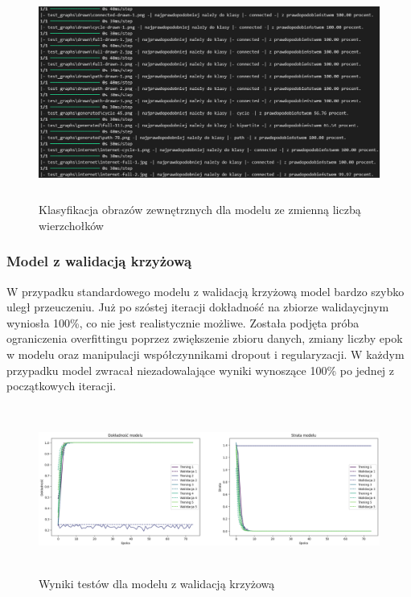 \begin{figure}[ht]
	\centering
	\includegraphics[height=7cm]{partials/images/tests/v2_epoch75_img_tests.png}
	\caption{Klasyfikacja obrazów zewnętrznych dla modelu ze zmienną liczbą wierzchołków}
\label{Fig:GraphUndirected}
\end{figure}
\FloatBarrier

\subsubsection{Model z walidacją krzyżową}

W przypadku standardowego modelu z walidacją krzyżową model bardzo szybko uległ przeuczeniu.
Już po szóstej iteracji dokładność na zbiorze walidaycjnym wyniosła 100\%, co nie jest realistycznie możliwe.
Została podjęta próba ograniczenia overfittingu poprzez zwiększenie zbioru danych, zmiany liczby epok w modelu
oraz manipulacji współczynnikami dropout i regularyzacji.
W każdym przypadku model zwracał niezadowalające wyniki wynoszące 100\% po jednej z początkowych iteracji.

\begin{figure}[ht]
	\centering
	\includegraphics[height=5.5cm]{partials/images/tests/v2_crossvalid.png}
	\caption{Wyniki testów dla modelu z walidacją krzyżową}
\label{Fig:GraphUndirected}
\end{figure}
\FloatBarrier

